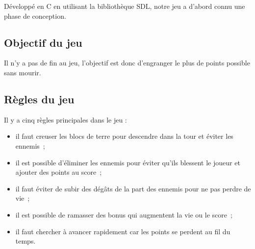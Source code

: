\documentclass[a4paper,12pt]{article}
\begin{document}
Développé en C en utilisant la bibliothèque SDL, notre jeu a d'abord connu une phase de conception.

\subsection{Objectif du jeu}
Il n’y a pas de fin au jeu, l’objectif est donc d’engranger le plus de points possible sans mourir.

\subsection{Règles du jeu}
Il y a cinq règles principales dans le jeu :
\begin{itemize}
	\item il faut creuser les blocs de terre pour descendre dans la tour et éviter les ennemis ;
	\item il est possible d’éliminer les ennemis pour éviter qu’ils blessent le joueur et ajouter des points au score ;
	\item il faut éviter de subir des dégâts de la part des ennemis pour ne pas perdre de vie ;
	\item il est possible de ramasser des bonus qui augmentent la vie ou le score ;
	\item il faut chercher à avancer rapidement car les points se perdent au fil du temps.
\end{itemize}
\end{document}
